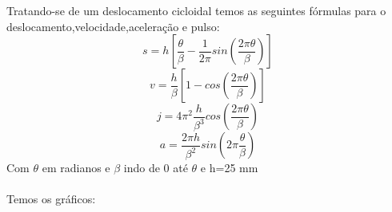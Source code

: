 \documentclass[11pt,a4paper]{article}
\begin{document}
\\\\
Tratando-se de um deslocamento cicloidal temos as seguintes fórmulas para o deslocamento,velocidade,aceleração e pulso:
$$s=h\left[\frac{\theta}{\beta}-\frac{1}{2\pi} sin\left(\frac{2\pi \theta}{\beta}\right)\right]$$
$$v=\frac{h}{\beta}\left[ 1-cos\left(\frac{2\pi \theta}{\beta}   \right)  \right]$$
$$j=4\pi^2 \frac{h}{\beta^3} cos\left(\frac{2\pi \theta}{\beta}   \right)$$
$$a=\frac{2\pi h}{\beta^2} sin\left(2\pi\frac{\theta}{\beta}\right)$$
Com $\theta$ em radianos e $\beta$ indo de 0 até $\theta$ e h=25 mm \\\\
Temos os gráficos:\\
\begin{figure}[h]
\center
{}
\qquad
{}
\qquad
{}
\qquad
{}

\end{figure}
\end{document}
